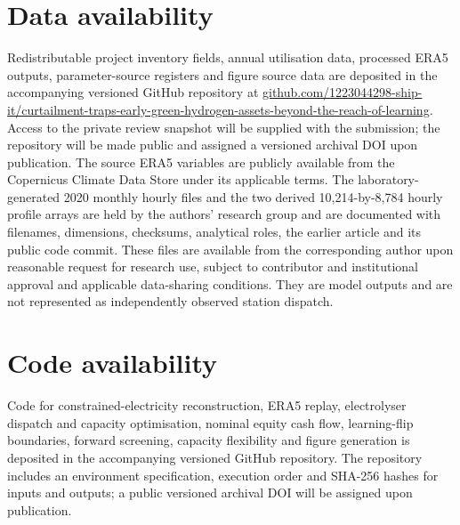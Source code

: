\documentclass[lineno,pdflatex,sn-nature]{sn-jnl}
\begin{document}
\section*{Data availability}

Redistributable project inventory fields, annual utilisation data, processed ERA5 outputs, parameter-source registers and figure source data are deposited in the accompanying versioned GitHub repository at \href{https://github.com/1223044298-ship-it/curtailment-traps-early-green-hydrogen-assets-beyond-the-reach-of-learning}{github.com/1223044298-ship-it/curtailment-traps-early-green-hydrogen-assets-beyond-the-reach-of-learning}. Access to the private review snapshot will be supplied with the submission; the repository will be made public and assigned a versioned archival DOI upon publication. The source ERA5 variables are publicly available from the Copernicus Climate Data Store under its applicable terms. The laboratory-generated 2020 monthly hourly files and the two derived 10,214-by-8,784 hourly profile arrays are held by the authors' research group and are documented with filenames, dimensions, checksums, analytical roles, the earlier article and its public code commit. These files are available from the corresponding author upon reasonable request for research use, subject to contributor and institutional approval and applicable data-sharing conditions. They are model outputs and are not represented as independently observed station dispatch.

\section*{Code availability}

Code for constrained-electricity reconstruction, ERA5 replay, electrolyser dispatch and capacity optimisation, nominal equity cash flow, learning-flip boundaries, forward screening, capacity flexibility and figure generation is deposited in the accompanying versioned GitHub repository. The repository includes an environment specification, execution order and SHA-256 hashes for inputs and outputs; a public versioned archival DOI will be assigned upon publication.
\end{document}
